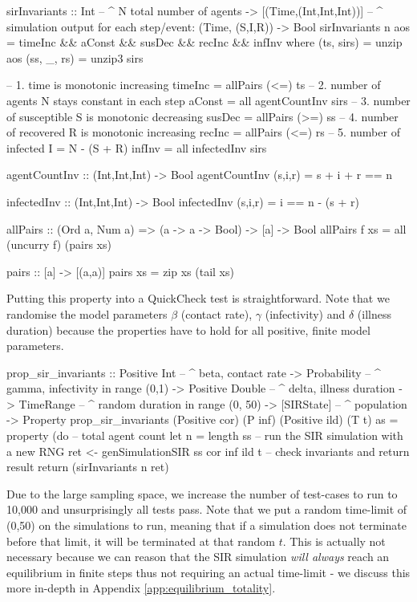 \begin{HaskellCode}
sirInvariants :: Int                    -- ^ N total number of agents
              -> [(Time,(Int,Int,Int))] -- ^ simulation output for each step/event: (Time, (S,I,R))
              -> Bool
sirInvariants n aos = timeInc && aConst && susDec && recInc && infInv
  where
    (ts, sirs)  = unzip aos
    (ss, _, rs) = unzip3 sirs

    -- 1. time is monotonic increasing
    timeInc = allPairs (<=) ts
    -- 2. number of agents N stays constant in each step
    aConst = all agentCountInv sirs
    -- 3. number of susceptible S is monotonic decreasing
    susDec = allPairs (>=) ss
    -- 4. number of recovered R is monotonic increasing
    recInc = allPairs (<=) rs
    -- 5. number of infected I = N - (S + R)
    infInv = all infectedInv sirs

    agentCountInv :: (Int,Int,Int) -> Bool
    agentCountInv (s,i,r) = s + i + r == n

    infectedInv :: (Int,Int,Int) -> Bool
    infectedInv (s,i,r) = i == n - (s + r)

    allPairs :: (Ord a, Num a) => (a -> a -> Bool) -> [a] -> Bool
    allPairs f xs = all (uncurry f) (pairs xs)

    pairs :: [a] -> [(a,a)]
    pairs xs = zip xs (tail xs)
\end{HaskellCode}

Putting this property into a QuickCheck test is straightforward. Note that we randomise the model parameters $\beta$ (contact rate), $\gamma$ (infectivity) and $\delta$ (illness duration) because the properties have to hold for all positive, finite model parameters.

\begin{HaskellCode}
prop_sir_invariants :: Positive Int    -- ^ beta, contact rate
                    -> Probability     -- ^ gamma, infectivity in range (0,1)
                    -> Positive Double -- ^ delta, illness duration
                    -> TimeRange       -- ^ random duration in range (0, 50)
                    -> [SIRState]      -- ^ population
                    -> Property
prop_sir_invariants 
    (Positive cor) (P inf) (Positive ild) (T t) as  = property (do
  -- total agent count
  let n = length ss
  -- run the SIR simulation with a new RNG 
  ret <- genSimulationSIR ss cor inf ild t
  -- check invariants and return result
  return (sirInvariants n ret)
\end{HaskellCode}

Due to the large sampling space, we increase the number of test-cases to run to 10,000 and unsurprisingly all tests pass. Note that we put a random time-limit of (0,50) on the simulations to run, meaning that if a simulation does not terminate before that limit, it will be terminated at that random $t$. This is actually not necessary because we can reason that the SIR simulation \textit{will always} reach an equilibrium in finite steps thus not requiring an actual time-limit - we discuss this more in-depth in Appendix \ref{app:equilibrium_totality}.

